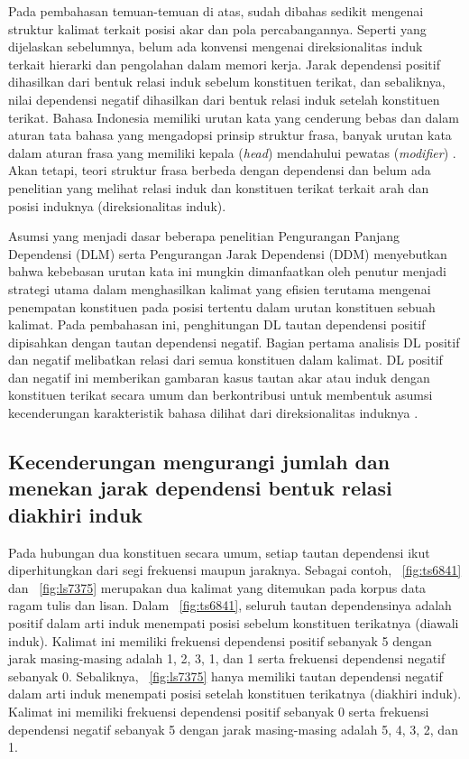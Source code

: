 Pada pembahasan temuan-temuan di atas, sudah dibahas sedikit mengenai struktur kalimat terkait posisi akar dan pola percabangannya. Seperti yang dijelaskan sebelumnya, belum ada konvensi mengenai direksionalitas induk terkait hierarki dan pengolahan dalam memori kerja. Jarak dependensi positif dihasilkan dari bentuk relasi induk sebelum konstituen terikat, dan sebaliknya, nilai dependensi negatif dihasilkan dari bentuk relasi induk setelah konstituen terikat. Bahasa Indonesia memiliki urutan kata yang cenderung bebas \citep[p. 265]{sneddon2010indonesian} dan dalam aturan tata bahasa yang mengadopsi prinsip struktur frasa, banyak urutan kata dalam aturan frasa yang memiliki kepala (\textit{head}) mendahului pewatas (\textit{modifier}) \citep{sneddon2010indonesian}. Akan tetapi, teori struktur frasa berbeda dengan dependensi dan belum ada penelitian yang melihat relasi induk dan konstituen terikat terkait arah dan posisi induknya (direksionalitas induk). 

Asumsi yang menjadi dasar beberapa penelitian Pengurangan Panjang Dependensi (DLM) \citep{futrell2015large} serta Pengurangan Jarak Dependensi (DDM) \citep{liu2017dependency} menyebutkan bahwa kebebasan urutan kata ini mungkin dimanfaatkan oleh penutur menjadi strategi utama dalam menghasilkan kalimat yang efisien terutama mengenai penempatan konstituen pada posisi tertentu dalam urutan konstituen sebuah kalimat. Pada pembahasan ini, penghitungan DL tautan dependensi positif dipisahkan dengan tautan dependensi negatif. Bagian pertama analisis DL positif dan negatif melibatkan relasi dari semua konstituen dalam kalimat. DL positif dan negatif ini memberikan gambaran kasus tautan akar atau induk dengan konstituen terikat secara umum dan berkontribusi untuk membentuk asumsi kecenderungan karakteristik bahasa dilihat dari direksionalitas induknya \citep{wang2017effects}. 

\subsection{Kecenderungan mengurangi jumlah dan menekan jarak dependensi bentuk relasi diakhiri induk}
Pada hubungan dua konstituen secara umum, setiap tautan dependensi ikut diperhitungkan dari segi frekuensi maupun jaraknya. Sebagai contoh, \pic~\ref{fig:ts6841} dan \pic~\ref{fig:ls7375} merupakan dua kalimat yang ditemukan pada korpus data ragam tulis dan lisan. Dalam \pic~\ref{fig:ts6841}, seluruh tautan dependensinya adalah positif dalam arti induk menempati posisi sebelum konstituen terikatnya (diawali induk). Kalimat ini memiliki frekuensi dependensi positif sebanyak 5 dengan jarak masing-masing adalah 1, 2, 3, 1, dan 1 serta frekuensi dependensi negatif sebanyak 0. Sebaliknya, \pic~\ref{fig:ls7375} hanya memiliki tautan dependensi negatif dalam arti induk menempati posisi setelah konstituen terikatnya (diakhiri induk). Kalimat ini memiliki frekuensi dependensi positif sebanyak 0 serta frekuensi dependensi negatif sebanyak 5 dengan jarak masing-masing adalah 5, 4, 3, 2, dan 1.

